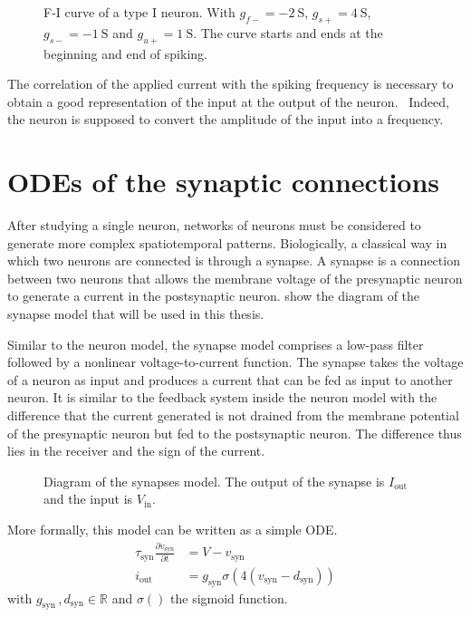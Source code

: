 \begin{figure}[!htb]
    \centering
    \caption{F-I curve of a type I neuron. With $g_{f-}=\qty{-2}{\siemens}$, $g_{s+}=\qty{4}{\siemens}$, $g_{s-}=\qty{-1}{\siemens}$ and $g_{u+}=\qty{1}{\siemens}$. The curve starts and ends at the beginning and end of spiking.}
    \label{fig:neuron_spiking}
\end{figure}

The correlation of the applied current with the spiking frequency is necessary to obtain a good representation of the input at the output of the neuron. 
Indeed, the neuron is supposed to convert the amplitude of the input into a frequency.

\section{ODEs of the synaptic connections}

After studying a single neuron, networks of neurons must be considered to generate more complex spatiotemporal patterns.
Biologically, a classical way in which two neurons are connected is through a synapse.
A synapse is a connection between two neurons that allows the membrane voltage of the presynaptic neuron to generate a current in the postsynaptic neuron.
 show the diagram of the synapse model that will be used in this thesis. 

Similar to the neuron model, the synapse model comprises a low-pass filter followed by a nonlinear voltage-to-current function.
The synapse takes the voltage of a neuron as input and produces a current that can be fed as input to another neuron.
It is similar to the feedback system inside the neuron model with the difference that the current generated is not drained from the membrane potential of the presynaptic neuron but fed to the postsynaptic neuron.
The difference thus lies in the receiver and the sign of the current.

\begin{figure}[!htb]
    \centering
    \caption{Diagram of the synapses model. The output of the synapse is $I_\text{out}$ and the input is $V_\text{in}$.}
    \label{fig:synapse_mod}
\end{figure}


More formally, this model can be written as a simple ODE.
\begin{align}
    \tau_\text{syn}\frac{\partial v_\text{syn}}{\partial t} &= V - v_\text{syn}\label{eq:syn_start}\\
    i_\text{out} &= g_\text{syn}\sigma\left(4\left(v_\text{syn} - d_\text{syn}\right)\right)\label{eq:syn_end}   
\end{align}
with $g_\text{syn}\,, d_\text{syn} \in \mathbb{R}$ and $\sigma\left(\right)$ the sigmoid function.

